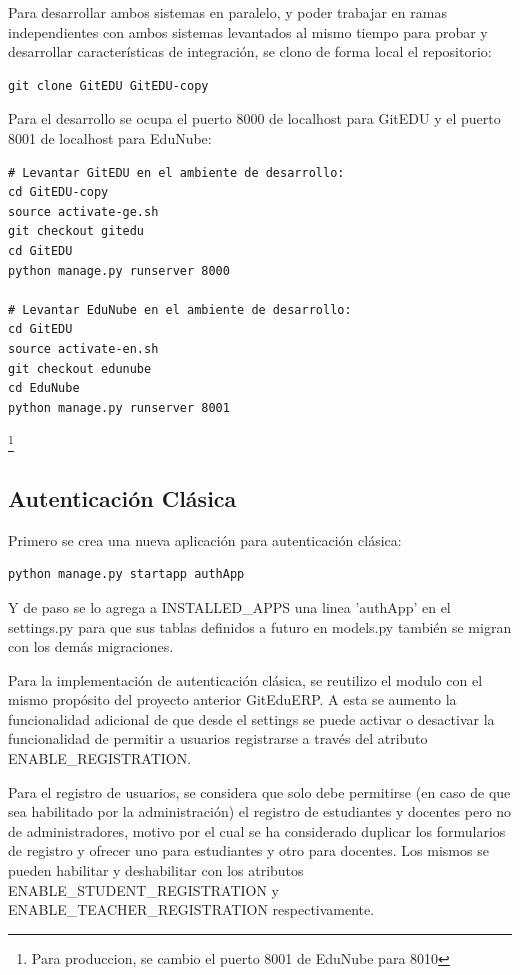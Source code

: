 Para desarrollar ambos sistemas en paralelo, y poder trabajar en ramas independientes con ambos sistemas levantados al mismo tiempo para probar y desarrollar características de integración, se clono de forma local el repositorio:
\begin{lstlisting}
git clone GitEDU GitEDU-copy
\end{lstlisting}

Para el desarrollo se ocupa el puerto 8000 de localhost para GitEDU y el puerto 8001 de localhost para EduNube:
\begin{lstlisting}
# Levantar GitEDU en el ambiente de desarrollo:
cd GitEDU-copy
source activate-ge.sh
git checkout gitedu
cd GitEDU
python manage.py runserver 8000

# Levantar EduNube en el ambiente de desarrollo:
cd GitEDU
source activate-en.sh
git checkout edunube
cd EduNube
python manage.py runserver 8001
\end{lstlisting}\footnote{Para produccion, se cambio el puerto 8001 de EduNube para 8010}


\subsection{Autenticación Clásica}

Primero se crea una nueva aplicación para autenticación clásica:
\begin{lstlisting}
python manage.py startapp authApp
\end{lstlisting}

Y de paso se lo agrega a INSTALLED\_APPS una linea 'authApp' en el settings.py para que sus tablas definidos a futuro en models.py también se migran con los demás migraciones.

Para la implementación de autenticación clásica, se reutilizo el modulo con el mismo propósito del proyecto anterior GitEduERP. A esta se aumento la funcionalidad adicional de que desde el settings se puede activar o desactivar la funcionalidad de permitir a usuarios registrarse a través del atributo ENABLE\_REGISTRATION. 

Para el registro de usuarios, se considera que solo debe permitirse (en caso de que sea habilitado por la administración) el registro de estudiantes y docentes pero no de administradores, motivo por el cual se ha considerado duplicar los formularios de registro y ofrecer uno para estudiantes y otro para docentes. Los mismos se pueden habilitar y deshabilitar con los atributos ENABLE\_STUDENT\_REGISTRATION y ENABLE\_TEACHER\_REGISTRATION respectivamente.

